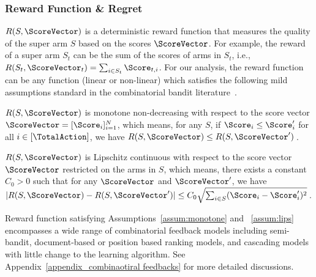 \documentclass{article}
\theoremstyle{plain}
\begin{document}
\subsubsection{Reward Function \& Regret}
$R(S, \ScoreVector)$ is a deterministic reward function that measures the quality of the super arm $S$ based on the scores $\ScoreVector$. 
For example, the reward of a super arm $S_t$ can be the sum of the scores of arms in $S_t$, i.e., $R(S_t, \ScoreVector_t) = \sum_{i \in S_t} \Score_{t, i}$.
For our analysis, the reward function can be any function (linear or non-linear) which satisfies the following mild assumptions standard in the combinatorial bandit literature~\cite{qin2014contextual, li2016contextual}.

\begin{assumption}[Monotonicity]\label{assum:monotone}
$R(S, \ScoreVector)$ is monotone non-decreasing with respect to the score vector $\ScoreVector = [\Score_i]_{i=1}^N$, which means, for any $S$, if $\Score_i \le \Score'_i$ for all $i \in [\TotalAction]$, we have $R(S, \ScoreVector) \le R(S, \ScoreVector') \,$.
\end{assumption}

\begin{assumption}\label{assum:lips}
$R(S, \ScoreVector)$ is Lipschitz continuous with respect to the score vector $\ScoreVector$ restricted on the arms in $S$, which means, there exists a constant $C_0 > 0 $ such that for any $\ScoreVector$ and $\ScoreVector'$, we have $ | R(S, \ScoreVector) - R(S, \ScoreVector') | \le C_0 \sqrt{\sum_{i \in S} (\Score_i - \Score'_i)^2 } \,$. 
\end{assumption}

\begin{remark} \label{remark_extension of reward}
Reward function satisfying Assumptions~\ref{assum:monotone} and ~\ref{assum:lips} encompasses a wide range of combinatorial feedback models including semi-bandit,
document-based or position based ranking models, and cascading models with little change to the learning algorithm. See Appendix~\ref{appendix_combinaotiral feedbacks} for more detailed discussions.
\end{remark}
\end{document}
